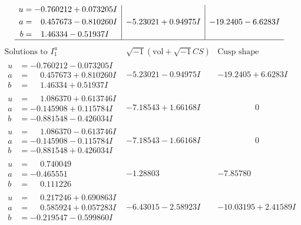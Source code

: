 \documentclass[1p]{elsarticle_modified}
\theoremstyle{definition}
\newcommand{\I}{\sqrt{-1}}
\begin{document}
$$\begin{array}{c|c|c}
\begin{aligned}
u &= -0.760212 + 0.073205 I \\
a &= \phantom{-}0.457673 - 0.810260 I \\
b &= \phantom{-}1.46334 - 0.51937 I\end{aligned}
 & -5.23021 + 0.94975 I & -19.2405 - 6.6283 I\\
 \hline 
 \end{array}$$\newpage$$\begin{array}{c|c|c}  
\text{Solutions to }I^u_{1}& \I (\text{vol} + \sqrt{-1}CS) & \text{Cusp shape}\\
 \hline 
\begin{aligned}
u &= -0.760212 - 0.073205 I \\
a &= \phantom{-}0.457673 + 0.810260 I \\
b &= \phantom{-}1.46334 + 0.51937 I\end{aligned}
 & -5.23021 - 0.94975 I & -19.2405 + 6.6283 I \\ \hline\begin{aligned}
u &= \phantom{-}1.086370 + 0.613746 I \\
a &= -0.145908 + 0.115784 I \\
b &= -0.881548 - 0.426034 I\end{aligned}
 & -7.18543 + 1.66168 I & \phantom{-0.000000 } 0 \\ \hline\begin{aligned}
u &= \phantom{-}1.086370 - 0.613746 I \\
a &= -0.145908 - 0.115784 I \\
b &= -0.881548 + 0.426034 I\end{aligned}
 & -7.18543 - 1.66168 I & \phantom{-0.000000 } 0 \\ \hline\begin{aligned}
u &= \phantom{-}0.740049\phantom{ +0.000000I} \\
a &= -0.465551\phantom{ +0.000000I} \\
b &= \phantom{-}0.111226\phantom{ +0.000000I}\end{aligned}
 & -1.28803\phantom{ +0.000000I} & -7.85780\phantom{ +0.000000I} \\ \hline\begin{aligned}
u &= \phantom{-}0.217246 + 0.690863 I \\
a &= \phantom{-}0.585924 + 0.057283 I \\
b &= -0.219547 - 0.599860 I\end{aligned}
 & -6.43015 - 2.58923 I & -10.03195 + 2.41589 I \\ \hline\begin{aligned}

\end{aligned}
\end{array}$$
\end{document}
